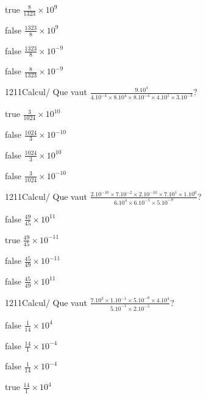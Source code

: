             \begin{reponses}
                \item[true] $\frac{8}{1323}\times 10^{9}$
                \item[false] $\frac{1323}{8}\times 10^{9}$
                \item[false] $\frac{1323}{8}\times 10^{-9}$
                \item[false] $\frac{8}{1323}\times 10^{-9}$
            \end{reponses}
            \begin{question}{1211}{Calcul}{}{/}
                Que vaut $\frac{9.10^{4}}{4.10^{-4}\times 8.10^{4}\times 8.10^{-4}\times 4.10^{1}\times 3.10^{-3}}$?
            \end{question}
            \begin{reponses}
                \item[true] $\frac{3}{1024}\times 10^{10}$
                \item[false] $\frac{1024}{3}\times 10^{-10}$
                \item[false] $\frac{1024}{3}\times 10^{10}$
                \item[false] $\frac{3}{1024}\times 10^{-10}$
            \end{reponses}
            \begin{question}{1211}{Calcul}{}{/}
                Que vaut $\frac{2.10^{-10}\times 7.10^{-2}\times 2.10^{-10}\times 7.10^{1}\times 1.10^{0}}{6.10^{4}\times 6.10^{-5}\times 5.10^{-9}}$?
            \end{question}
            \begin{reponses}
                \item[false] $\frac{49}{45}\times 10^{11}$
                \item[true] $\frac{49}{45}\times 10^{-11}$
                \item[false] $\frac{45}{49}\times 10^{-11}$
                \item[false] $\frac{45}{49}\times 10^{11}$
            \end{reponses}
            \begin{question}{1211}{Calcul}{}{/}
                Que vaut $\frac{7.10^{3}\times 1.10^{-1}\times 5.10^{-8}\times 4.10^{4}}{5.10^{-1}\times 2.10^{-5}}$?
            \end{question}
            \begin{reponses}
                \item[false] $\frac{1}{14}\times 10^{4}$
                \item[false] $\frac{14}{1}\times 10^{-4}$
                \item[false] $\frac{1}{14}\times 10^{-4}$
                \item[true] $\frac{14}{1}\times 10^{4}$
            \end{reponses}
